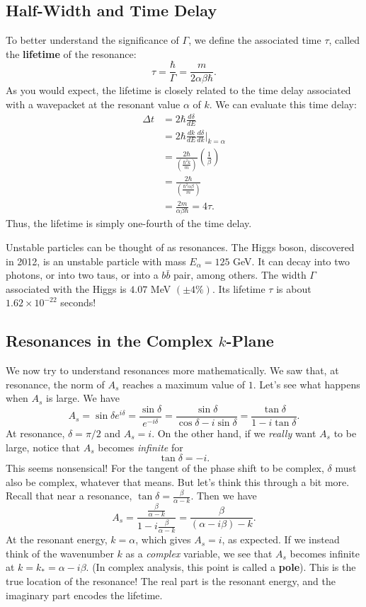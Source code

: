 \subsection{Half-Width and Time Delay}\label{half_width_time_delay}

To better understand the significance of $\Gamma$, we define the associated time $\tau$, called the \textbf{lifetime} of the resonance: $$\tau=\frac{\hbar}{\Gamma}=\frac{m}{2\alpha\beta\hbar}.$$As you would expect, the lifetime is closely related to the time delay associated with a wavepacket at the resonant value $\alpha$ of $k$. We can evaluate this time delay: \begin{align*}\Delta t&=2\hbar\frac{d\delta}{dE}\\&=2\hbar\frac{dk}{dE}\frac{d\delta}{dk}\bigg|_{k=\alpha}\\&=\frac{2\hbar}{(\frac{\hbar^2k}{m})}(\frac{1}{\beta})\\&=\frac{2\hbar}{(\frac{\hbar^2\alpha\beta}{m})}\\&=\frac{2m}{\alpha\beta\hbar}=4\tau.\end{align*}Thus, the lifetime is simply one-fourth of the time delay.

\begin{framedrmk*}
    Unstable particles can be thought of as resonances. The Higgs boson, discovered in 2012, is an unstable particle with mass $E_\alpha=125$ GeV. It can decay into two photons, or into two taus, or into a $b\bar{b}$ pair, among others. The width $\Gamma$ associated with the Higgs is $4.07$ MeV $(\pm4\%)$. Its lifetime $\tau$ is about $1.62\times 10^{-22}$ seconds!
\end{framedrmk*}

\subsection{Resonances in the Complex $k$-Plane}\label{resonances_complex_plane}

We now try to understand resonances more mathematically. We saw that, at resonance, the norm of $A_s$ reaches a maximum value of $1$. Let's see what happens when $A_s$ is large. We have $$A_s=\sin\delta e^{i\delta}=\frac{\sin\delta}{e^{-i\delta}}=\frac{\sin\delta}{\cos\delta-i\sin\delta}=\frac{\tan\delta}{1-i\tan\delta}.$$At resonance, $\delta=\pi/2$ and $A_s=i$. On the other hand, if we \textit{really} want $A_s$ to be large, notice that $A_s$ becomes \textit{infinite} for $$\tan\delta=-i.$$This seems nonsensical! For the tangent of the phase shift to be complex, $\delta$  must also be complex, whatever that means. But let's think this through a bit more. Recall that near a resonance, $\tan\delta=\frac{\beta}{\alpha-k}.$ Then we have $$A_s=\frac{\frac{\beta}{\alpha-k}}{1-i\frac{\beta}{\alpha-k}}=\frac{\beta}{(\alpha-i\beta)-k}.$$At the resonant energy, $k=\alpha$, which gives $A_s=i$, as expected. If we instead think of the wavenumber $k$ as a \textit{complex} variable, we see that $A_s$ becomes infinite at $k=k_*=\alpha-i\beta$. (In complex analysis, this point is called a \textbf{pole}). This is the true location of the resonance! The real part is the resonant energy, and the imaginary part encodes the lifetime.

